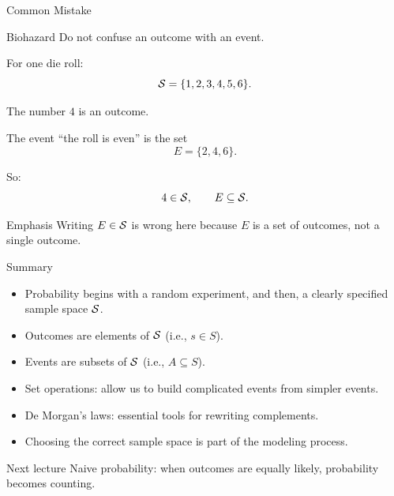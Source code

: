 \begin{frame}{Common Mistake}
\begin{keybox}{Biohazard}
Do not confuse an outcome with an event.
\end{keybox}

\vspace{0.3cm}

For one die roll:
\[
\mathcal{S} = \{1,2,3,4,5,6\}.
\]

The number $4$ is an outcome.

The event ``the roll is even'' is the set
\[
E = \{2,4,6\}.
\]

So:
\[
4 \in \mathcal{S},
\qquad
E \subseteq \mathcal{S}.
\]

\begin{livebox}{Emphasis}
Writing $E \in \mathcal{S}$ is wrong here because $E$ is a set of outcomes, not a single outcome.
\end{livebox}
\end{frame}

\begin{frame}{Summary}
\begin{itemize}
    \item Probability begins with a random experiment, and then, a clearly specified sample space $\mathcal{S}$.
    \item Outcomes are elements of $\mathcal{S}$ (i.e., $s\in S$).
    \item Events are subsets of $\mathcal{S}$ (i.e., $A\subseteq S$).
    \item Set operations:  allow us to build complicated events from simpler events.
    \item De Morgan's laws:  essential tools for rewriting complements.
    \item Choosing the correct sample space is part of the modeling process.
\end{itemize}

\vspace{0.3cm}

\begin{keybox}{Next lecture}
Naive probability: when outcomes are equally likely, probability becomes counting.
\end{keybox}
\end{frame}